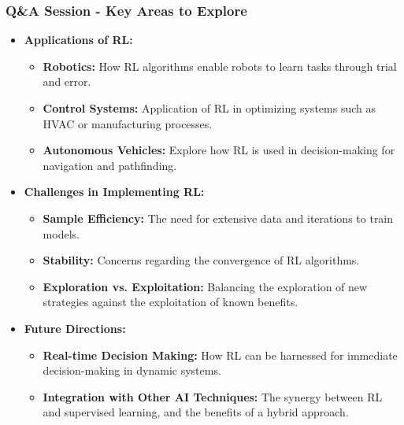 \documentclass[aspectratio=169]{beamer}
\begin{document}
\begin{frame}[fragile]
    \frametitle{Q\&A Session - Key Areas to Explore}
    \begin{itemize}
        \item \textbf{Applications of RL:}
            \begin{itemize}
                \item \textbf{Robotics:} How RL algorithms enable robots to learn tasks through trial and error.
                \item \textbf{Control Systems:} Application of RL in optimizing systems such as HVAC or manufacturing processes.
                \item \textbf{Autonomous Vehicles:} Explore how RL is used in decision-making for navigation and pathfinding.
            \end{itemize}

        \item \textbf{Challenges in Implementing RL:}
            \begin{itemize}
                \item \textbf{Sample Efficiency:} The need for extensive data and iterations to train models.
                \item \textbf{Stability:} Concerns regarding the convergence of RL algorithms.
                \item \textbf{Exploration vs. Exploitation:} Balancing the exploration of new strategies against the exploitation of known benefits.
            \end{itemize}

        \item \textbf{Future Directions:}
            \begin{itemize}
                \item \textbf{Real-time Decision Making:} How RL can be harnessed for immediate decision-making in dynamic systems.
                \item \textbf{Integration with Other AI Techniques:} The synergy between RL and supervised learning, and the benefits of a hybrid approach.
            \end{itemize}
    \end{itemize}
\end{frame}
\end{document}
